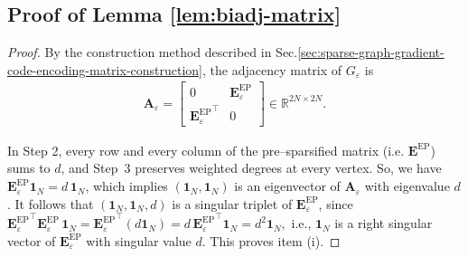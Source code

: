 \documentclass[lettersize,journal]{IEEEtran}
\newcommand{\adj}{\a}
\newcommand{\ones}[1]{\boldsymbol{1}_{#1}}
\newcommand{\GEP}{\boldsymbol{E}^{\mathrm{EP}}}
\renewcommand{\a}{\boldsymbol{a}}
\renewcommand{\adj}{\boldsymbol{A}}
\begin{document}
{\subsection{Proof of Lemma \ref{lem:biadj-matrix}}
\label{proof of lem:biadj-matrix}
\begin{proof}
By the construction method described in Sec.\ref{sec:sparse-graph-gradient-code-encoding-matrix-construction}, the adjacency matrix of $G_\varepsilon$ is 
\begin{align*}
    \adj_\varepsilon =\begin{bmatrix} 0 & \GEP_\varepsilon \\[2pt] {\GEP_\varepsilon}^\top & 0 \end{bmatrix}\in\mathbb{R}^{2N\times 2N}.
\end{align*}

In Step 2, every row and every column of the pre–sparsified matrix (i.e. $\GEP$) sums to $d$, and Step~3 preserves weighted degrees at every vertex. So, we have $ \GEP_\varepsilon\ones{N} = d\,\ones{N}$,
which implies $(\ones{N},\ones{N})$ is an eigenvector of $\adj_\varepsilon$ with eigenvalue $d$. It follows that $(\ones{N},\ones{N},d)$ is a singular triplet of $\GEP_\varepsilon$, since
$    {\GEP_\varepsilon}^\top \GEP_\varepsilon\,\ones{N} = {\GEP_\varepsilon}^\top(d\ones{N}) = d\,{\GEP_\varepsilon}^\top \ones{N} = d^2 \ones{N},$
i.e., $\ones{N}$ is a right singular vector of $\GEP_\varepsilon$ with singular value $d$. This proves item (i).


\end{proof}}
\end{document}
